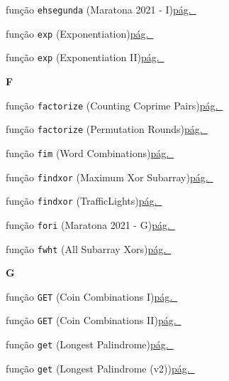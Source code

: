 \documentclass[10pt, a4paper, twocolumn, landscape]{article}
\begin{document}
{\noindent função \texttt{ehsegunda} {\scriptsize\color{codegray}(Maratona 2021 - I)}\dotfill\hyperref[fn90]{pág.~\pageref*{fn90}}\par
\noindent função \texttt{exp} {\scriptsize\color{codegray}(Exponentiation)}\dotfill\hyperref[fn5]{pág.~\pageref*{fn5}}\par
\noindent função \texttt{exp} {\scriptsize\color{codegray}(Exponentiation II)}\dotfill\hyperref[fn17]{pág.~\pageref*{fn17}}\par
\par\medskip\textbf{\large F}\par
\noindent função \texttt{factorize} {\scriptsize\color{codegray}(Counting Coprime Pairs)}\dotfill\hyperref[fn54]{pág.~\pageref*{fn54}}\par
\noindent função \texttt{factorize} {\scriptsize\color{codegray}(Permutation Rounds)}\dotfill\hyperref[fn79]{pág.~\pageref*{fn79}}\par
\noindent função \texttt{fim} {\scriptsize\color{codegray}(Word Combinations)}\dotfill\hyperref[fn28]{pág.~\pageref*{fn28}}\par
\noindent função \texttt{findxor} {\scriptsize\color{codegray}(Maximum Xor Subarray)}\dotfill\hyperref[fn15]{pág.~\pageref*{fn15}}\par
\noindent função \texttt{findxor} {\scriptsize\color{codegray}(TrafficLights)}\dotfill\hyperref[fn86]{pág.~\pageref*{fn86}}\par
\noindent função \texttt{fori} {\scriptsize\color{codegray}(Maratona 2021 - G)}\dotfill\hyperref[fn35]{pág.~\pageref*{fn35}}\par
\noindent função \texttt{fwht} {\scriptsize\color{codegray}(All Subarray Xors)}\dotfill\hyperref[fn72]{pág.~\pageref*{fn72}}\par
\par\medskip\textbf{\large G}\par
\noindent função \texttt{GET} {\scriptsize\color{codegray}(Coin Combinations I)}\dotfill\hyperref[fn10]{pág.~\pageref*{fn10}}\par
\noindent função \texttt{GET} {\scriptsize\color{codegray}(Coin Combinations II)}\dotfill\hyperref[fn11]{pág.~\pageref*{fn11}}\par
\noindent função \texttt{get} {\scriptsize\color{codegray}(Longest Palindrome)}\dotfill\hyperref[fn7]{pág.~\pageref*{fn7}}\par
\noindent função \texttt{get} {\scriptsize\color{codegray}(Longest Palindrome (v2))}\dotfill\hyperref[fn8]{pág.~\pageref*{fn8}}\par
}
\end{document}
